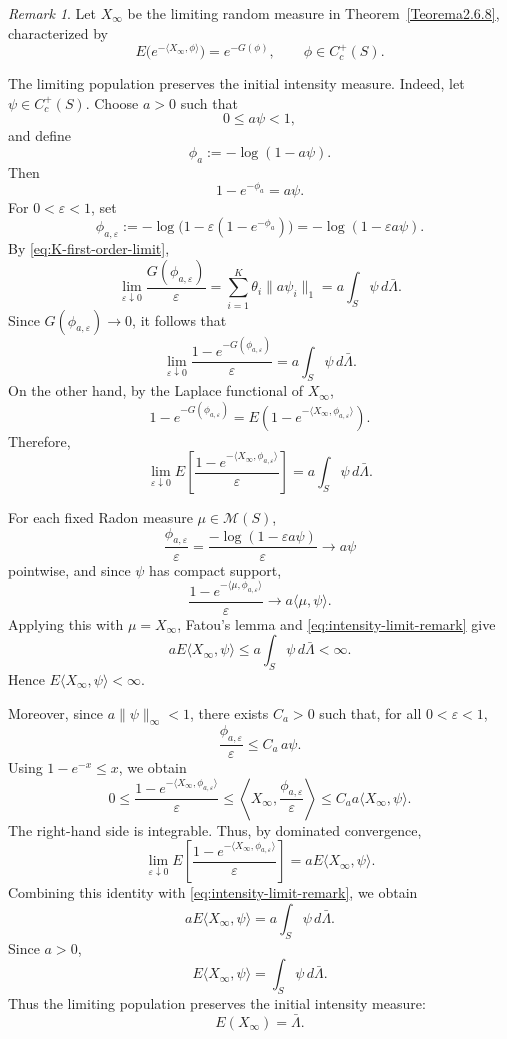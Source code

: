 \documentclass[reqno,final,11pt]{amsart}
\newcommand{\1}{\mathbbm{1}}
\theoremstyle{plain}
\theoremstyle{definition}
\theoremstyle{remark}
\newtheorem{remark}[theorem]{Remark}
\begin{document}
\begin{remark}
Let \(X_\infty\) be the limiting random measure in
Theorem~\ref{Teorema2.6.8}, characterized by
\[
E\bigl(e^{-\langle X_\infty,\phi\rangle}\bigr)
=
e^{-G(\phi)},
\qquad
\phi\in C_c^+(S).
\]

The limiting population preserves the initial intensity measure. Indeed, let \(\psi\in C_c^+(S)\). Choose \(a>0\) such that
\[
0\le a\psi<1,
\]
and define
\[
\phi_a:=-\log(1-a\psi).
\]
Then
\[
1-e^{-\phi_a}=a\psi.
\]
For \(0<\varepsilon<1\), set
\[
\phi_{a,\varepsilon}
:=
-\log\bigl(1-\varepsilon(1-e^{-\phi_a})\bigr)
=
-\log(1-\varepsilon a\psi).
\]
By \eqref{eq:K-first-order-limit},
\[
\lim_{\varepsilon\downarrow0}
\frac{G(\phi_{a,\varepsilon})}{\varepsilon}
=
\sum_{i=1}^K\theta_i\|a\psi_i\|_1
=
a\int_S\psi\,d\bar\Lambda .
\]
Since \(G(\phi_{a,\varepsilon})\to0\), it follows that
\[
\lim_{\varepsilon\downarrow0}
\frac{1-e^{-G(\phi_{a,\varepsilon})}}{\varepsilon}
=
a\int_S\psi\,d\bar\Lambda .
\]
On the other hand, by the Laplace functional of \(X_\infty\),
\[
1-e^{-G(\phi_{a,\varepsilon})}
=
E\left(
1-e^{-\langle X_\infty,\phi_{a,\varepsilon}\rangle}
\right).
\]
Therefore,
\begin{equation}\label{eq:intensity-limit-remark}
\lim_{\varepsilon\downarrow0}
E\left[
\frac{
1-e^{-\langle X_\infty,\phi_{a,\varepsilon}\rangle}
}{\varepsilon}
\right]
=
a\int_S\psi\,d\bar\Lambda .
\end{equation}

For each fixed Radon measure \(\mu\in\mathcal M(S)\),
\[
\frac{\phi_{a,\varepsilon}}{\varepsilon}
=
\frac{-\log(1-\varepsilon a\psi)}{\varepsilon}
\longrightarrow
a\psi
\]
pointwise, and since \(\psi\) has compact support,
\[
\frac{
1-e^{-\langle \mu,\phi_{a,\varepsilon}\rangle}
}{\varepsilon}
\longrightarrow
a\langle \mu,\psi\rangle .
\]
Applying this with \(\mu=X_\infty\), Fatou's lemma and
\eqref{eq:intensity-limit-remark} give
\[
aE\langle X_\infty,\psi\rangle
\le
a\int_S\psi\,d\bar\Lambda
<\infty.
\]
Hence \(E\langle X_\infty,\psi\rangle<\infty\).

Moreover, since \(a\|\psi\|_\infty<1\), there exists \(C_a>0\) such that, for all
\(0<\varepsilon<1\),
\[
\frac{\phi_{a,\varepsilon}}{\varepsilon}
\le
C_a\,a\psi .
\]
Using \(1-e^{-x}\le x\), we obtain
\[
0\le
\frac{
1-e^{-\langle X_\infty,\phi_{a,\varepsilon}\rangle}
}{\varepsilon}
\le
\left\langle X_\infty,\frac{\phi_{a,\varepsilon}}{\varepsilon}\right\rangle
\le
C_a a\langle X_\infty,\psi\rangle .
\]
The right-hand side is integrable. Thus, by dominated convergence,
\[
\lim_{\varepsilon\downarrow0}
E\left[
\frac{
1-e^{-\langle X_\infty,\phi_{a,\varepsilon}\rangle}
}{\varepsilon}
\right]
=
aE\langle X_\infty,\psi\rangle .
\]
Combining this identity with \eqref{eq:intensity-limit-remark}, we obtain
\[
aE\langle X_\infty,\psi\rangle
=
a\int_S\psi\,d\bar\Lambda .
\]
Since \(a>0\),
\[
E\langle X_\infty,\psi\rangle
=
\int_S\psi\,d\bar\Lambda .
\]
Thus the limiting population preserves the initial intensity measure:
\[
E(X_\infty)=\bar\Lambda .
\]
\end{remark}
\end{document}
